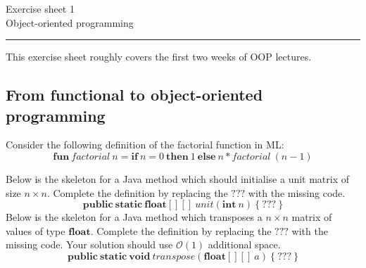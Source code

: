\documentclass[10pt,a4paper,fleqn]{exam}
\begin{document}
\begin{center}
\Large Exercise sheet 1 \\
\LARGE Object-oriented programming 
\end{center}

\hrule

\vspace{0.5cm}

This exercise sheet roughly covers the first two weeks of OOP lectures. 

\begin{questions}

\section{From functional to object-oriented programming}

\question Consider the following definition of the factorial function in ML:
\begin{displaymath}
\mathbf{fun}~\mathit{factorial}~n = \mathbf{if}~n = 0~\mathbf{then}~1~\mathbf{else}~n * \mathit{factorial}~(n-1)
\end{displaymath}
\question Below is the skeleton for a Java method which should initialise a unit matrix of size $n \times n$. Complete the definition by replacing the $???$ with the missing code.
\begin{displaymath}
\mathbf{public}~\mathbf{static}~\mathbf{float}[][]~\mathit{unit}(\mathbf{int}~n)~\{~???~\}
\end{displaymath}
\question Below is the skeleton for a Java method which transposes a $n \times n$ matrix of values of type $\mathbf{float}$. Complete the definition by replacing the $???$ with the missing code. Your solution should use $\mathcal{O}(1)$ additional space.
\begin{displaymath}
\mathbf{public}~\mathbf{static}~\mathbf{void}~\mathit{transpose}(\mathbf{float}[][]~a)~\{~???~\}
\end{displaymath}


\end{questions}
\end{document}
